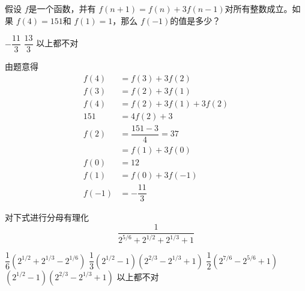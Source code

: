 \documentclass[answers]{exam}
\begin{document}
\begin{questions}
	\question 假设 \( f \)是一个函数，并有 \( f(n+1) = f(n) + 3f(n-1) \)对所有整数成立。如果 \( f(4) = 151 \)和 \( f(1)
	= 1\)，那么 \( f(-1) \)的值是多少？

	\begin{oneparchoices}
		  \CorrectChoice \( -\dfrac{11}{3} \) \choice \( \dfrac{13}{3} \) \choice 以上都不对
	\end{oneparchoices}

	\begin{solution}
		由题意得
		\begin{align*}
			f(4)  & = f(3) + 3f(2)           \\
			f(3)  & = f(2) + 3f(1)           \\
			f(4)  & = f(2) + 3f(1) + 3f(2)   \\
			151   & = 4f(2) + 3              \\
			f(2)  & = \dfrac{151 -3}{4} = 37 \\
			      & = f(1) + 3f(0)           \\
			f(0)  & = 12                     \\
			f(1)  & = f(0) + 3f(-1)          \\
			f(-1) & = -\dfrac{11}{3}
		\end{align*}
	\end{solution}

	\question 对下式进行分母有理化
	\begin{equation*}
		\dfrac{1}{2^{5/6} + 2^{1/2} + 2^{1/3} + 1}
	\end{equation*}

	\begin{oneparchoices}
		\choice \( \dfrac{1}{6}(2^{1/2} + 2^{1/3} - 2^{1/6}) \)
		\choice \( \dfrac{1}{3}(2^{1/2} - 1)(2^{2/3} - 2^{1/3} + 1) \)
		\choice \( \dfrac{1}{2}(2^{7/6} - 2^{5/6} + 1) \)
		\CorrectChoice \( (2^{1/2} - 1)(2^{2/3} - 2^{1/3} + 1) \)
		\choice 以上都不对
	\end{oneparchoices}


\end{questions}
\end{document}
